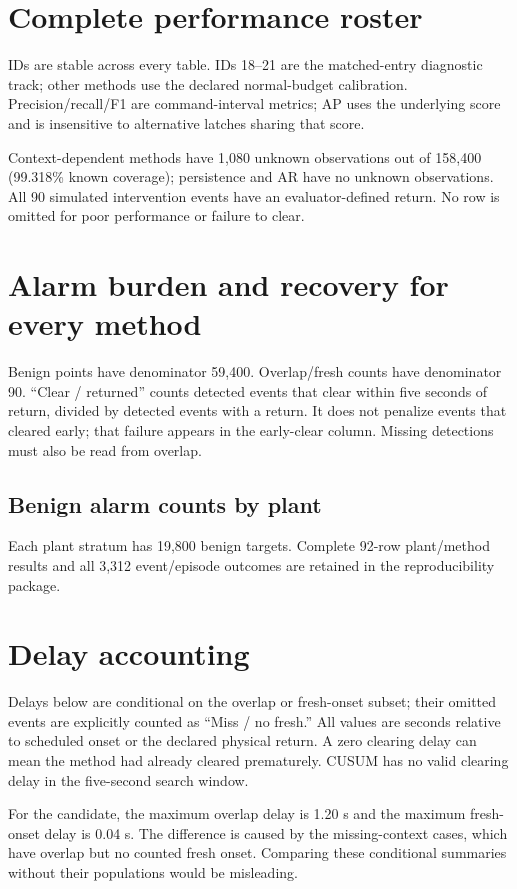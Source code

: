 \section{Complete performance roster}\label{app:all}
IDs are stable across every table. IDs 18--21 are the matched-entry diagnostic track; other methods use the declared normal-budget calibration. Precision/recall/F1 are command-interval metrics; AP uses the underlying score and is insensitive to alternative latches sharing that score.
\begin{center}\small\end{center}
Context-dependent methods have 1,080 unknown observations out of 158,400 (99.318\% known coverage); persistence and AR have no unknown observations. All 90 simulated intervention events have an evaluator-defined return. No row is omitted for poor performance or failure to clear.
\clearpage
\section{Alarm burden and recovery for every method}
Benign points have denominator 59,400. Overlap/fresh counts have denominator 90. ``Clear / returned'' counts detected events that clear within five seconds of return, divided by detected events with a return. It does not penalize events that cleared early; that failure appears in the early-clear column. Missing detections must also be read from overlap.
\begin{center}\small\end{center}
\subsection*{Benign alarm counts by plant}
\begin{center}\small\end{center}
Each plant stratum has 19,800 benign targets. Complete 92-row plant/method results and all 3,312 event/episode outcomes are retained in the reproducibility package.
\clearpage
\section{Delay accounting}
Delays below are conditional on the overlap or fresh-onset subset; their omitted events are explicitly counted as ``Miss / no fresh.'' All values are seconds relative to scheduled onset or the declared physical return. A zero clearing delay can mean the method had already cleared prematurely. CUSUM has no valid clearing delay in the five-second search window.
\begin{center}\small\end{center}
For the candidate, the maximum overlap delay is 1.20 s and the maximum fresh-onset delay is 0.04 s. The difference is caused by the missing-context cases, which have overlap but no counted fresh onset. Comparing these conditional summaries without their populations would be misleading.
\clearpage
